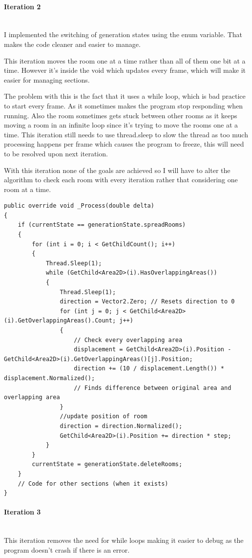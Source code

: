 \documentclass{article}
\newcommand{\parBr}{\vspace{5mm}}%
\newcommand{\myparagraph}[1]{\paragraph{#1}\mbox{}\\} %
\begin{document}
\myparagraph{Iteration 2}
I implemented the switching of generation states using the enum variable. That makes the code cleaner and easier to manage.

\parBr

This iteration moves the room one at a time rather than all of them one bit at a time. However it's inside the void which updates every frame, which will make it easier for managing sections.

\parBr

The problem with this is the fact that it uses a while loop, which is bad practice to start every frame. As it sometimes makes the program stop responding when running. Also the room sometimes gets stuck between other rooms as it keeps moving a room in an infinite loop since it's trying to move the rooms one at a time. This iteration still needs to use thread.sleep to slow the thread as too much processing happens per frame which causes the program to freeze, this will need to be resolved upon next iteration.

\parBr

With this iteration none of the goals are achieved so I will have to alter the algorithm to check each room with every iteration rather that considering one room at a time.
\begin{lstlisting}
public override void _Process(double delta)
{
    if (currentState == generationState.spreadRooms)
    {
        for (int i = 0; i < GetChildCount(); i++)
        {
            Thread.Sleep(1);
            while (GetChild<Area2D>(i).HasOverlappingAreas())
            {
                Thread.Sleep(1);
                direction = Vector2.Zero; // Resets direction to 0
                for (int j = 0; j < GetChild<Area2D>(i).GetOverlappingAreas().Count; j++) 
                {
                	// Check every overlapping area
                    displacement = GetChild<Area2D>(i).Position - GetChild<Area2D>(i).GetOverlappingAreas()[j].Position;
                    direction += (10 / displacement.Length()) * displacement.Normalized(); 
                    // Finds difference between original area and overlapping area
                }
                //update position of room
                direction = direction.Normalized();
                GetChild<Area2D>(i).Position += direction * step;
            }
        }
        currentState = generationState.deleteRooms;
    }
    // Code for other sections (when it exists)
}
\end{lstlisting}

\myparagraph{Iteration 3}
This iteration removes the need for while loops making it easier to debug as the program doesn't crash if there is an error. 
\end{document}
